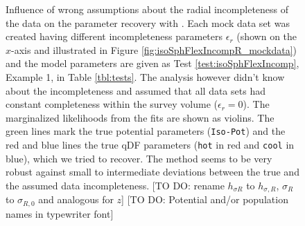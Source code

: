\addtocounter{figure}{-1}
\begin{figure} [t!]
\caption{Influence of wrong assumptions about the radial incompleteness of the data on the parameter recovery with \RM{}. Each mock data set was created having different incompleteness parameters $\epsilon_r$ (shown on the $x$-axis and illustrated in Figure \ref{fig:isoSphFlexIncompR_mockdata}) and the model parameters are given as Test \ref{test:isoSphFlexIncomp}, Example 1, in Table \ref{tbl:tests}. The analysis however didn't know about the incompleteness and assumed that all data sets had constant completeness within the survey volume ($\epsilon_r = 0$). The marginalized likelihoods from the fits are shown as violins. The green lines mark the true potential parameters (\texttt{Iso-Pot}) and the red and blue lines the true qDF parameters (\texttt{hot} \MAP in red and \texttt{cool} \MAP in blue), which we tried to recover. The \RM{} method seems to be very robust against small to intermediate deviations between the true and the assumed data incompleteness. [TO DO: rename $h_{\sigma R}$ to $h_{\sigma,R}$, $\sigma_R$ to $\sigma_{R,0}$ and analogous for $z$] [TO DO: Potential and/or population names in typewriter font]} 
\label{fig:isoSphFlexIncompR_violins}
\end{figure}

